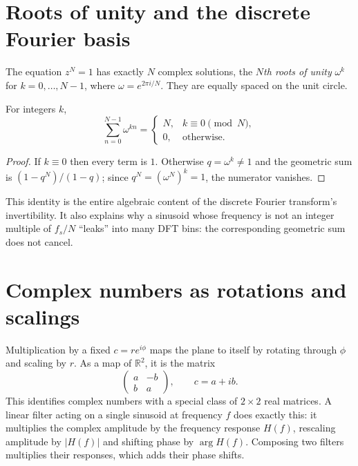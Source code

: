 \section{Roots of unity and the discrete Fourier basis}
The equation $z^N=1$ has exactly $N$ complex solutions, the \emph{$N$th roots of unity} $\omega^k$ for $k=0,\ldots,N-1$, where $\omega=e^{2\pi i/N}$. They are equally spaced on the unit circle.

\begin{proposition}
For integers $k$,
\[
\sum_{n=0}^{N-1}\omega^{kn}=\begin{cases}N,&k\equiv0\pmod N,\\0,&\text{otherwise.}\end{cases}
\]
\end{proposition}
\begin{proof}
If $k\equiv0$ then every term is $1$. Otherwise $q=\omega^k\ne1$ and the geometric sum is $(1-q^N)/(1-q)$; since $q^N=(\omega^N)^k=1$, the numerator vanishes.
\end{proof}
This identity is the entire algebraic content of the discrete Fourier transform's invertibility. It also explains why a sinusoid whose frequency is not an integer multiple of $f_s/N$ ``leaks'' into many DFT bins: the corresponding geometric sum does not cancel.

\section{Complex numbers as rotations and scalings}
Multiplication by a fixed $c=re^{i\phi}$ maps the plane to itself by rotating through $\phi$ and scaling by $r$. As a map of $\mathbb R^2$, it is the matrix
\[
\begin{pmatrix}a&-b\\b&a\end{pmatrix},\qquad c=a+ib.
\]
This identifies complex numbers with a special class of $2\times2$ real matrices. A linear filter acting on a single sinusoid at frequency $f$ does exactly this: it multiplies the complex amplitude by the frequency response $H(f)$, rescaling amplitude by $|H(f)|$ and shifting phase by $\arg H(f)$. Composing two filters multiplies their responses, which adds their phase shifts.

